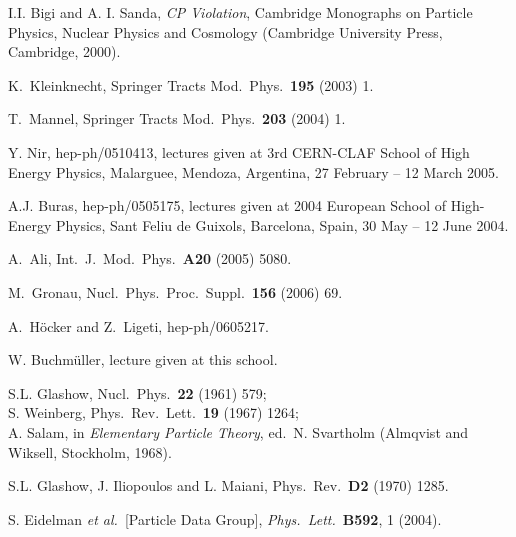 \documentclass[12pt]{article}
\begin{document}
\begin{thebibliography}{999}
I.I. Bigi and A. I. Sanda, {\it CP Violation},
Cambridge Monographs on Particle Physics, Nuclear Physics and 
Cosmology (Cambridge University Press, Cambridge, 2000).

K.~Kleinknecht,
  Springer Tracts Mod.\ Phys.\  {\bf 195} (2003) 1.

T.~Mannel,
  Springer Tracts Mod.\ Phys.\  {\bf 203} (2004) 1.

Y. Nir,   hep-ph/0510413, 
lectures given at 3rd CERN-CLAF School of High Energy Physics, Malarguee, Mendoza, Argentina, 27 February -- 12 March 2005.
  
A.J. Buras,
  hep-ph/0505175, lectures given at 2004 European School of High-Energy Physics, 
  Sant Feliu de Guixols, Barcelona, Spain, 30 May -- 12 June 2004. 
    
A.~Ali,
   Int.\ J.\ Mod.\ Phys.\  {\bf A20} (2005) 5080.
  
 M.~Gronau,
  Nucl.\ Phys.\ Proc.\ Suppl.\  {\bf 156} (2006) 69.
  
A.~H\"ocker and Z.~Ligeti,
 hep-ph/0605217.
    
W. Buchm\"uller, lecture given at this school.

S.L. Glashow, { Nucl.\ Phys.}~{\bf 22} (1961) 579;\\
S. Weinberg, { Phys.\ Rev.\ Lett.}~{\bf 19} (1967) 1264;\\ 
A. Salam, in {\it Elementary Particle Theory}, ed.\ N. Svartholm 
(Almqvist and Wiksell, Stockholm, 1968).


S.L. Glashow, J. Iliopoulos and L. Maiani,
{ Phys.\ Rev.}~{\bf D2} (1970) 1285.

S. Eidelman {\it et al.}\ [Particle Data Group],
{\it  Phys.\ Lett.}~{\bf B592}, 1 (2004).



\end{thebibliography}
\end{document}

